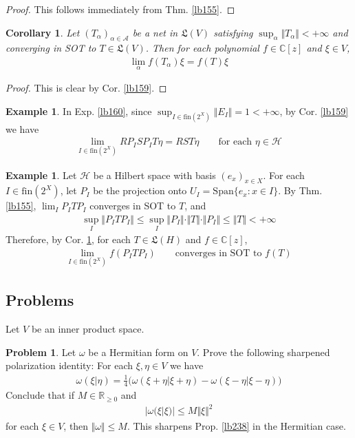 \documentclass[12pt,b5paper,notitlepage]{article}
\theoremstyle{definition}
\newtheorem{eg}[df]{Example}
\newtheorem{prob}{\color{red}Problem}[section]
\theoremstyle{plain}
\newtheorem{co}[df]{Corollary}
\newcommand{\fk}{\mathfrak}
\newcommand{\Span}{\mathrm{Span}}
\newcommand{\scr}{\mathscr}
\newcommand{\Cbb}{\mathbb C}
\newcommand{\Rbb}{\mathbb R}
\newcommand{\fin}{\mathrm{fin}}
\newcommand{\MH}{\mathcal H}
\numberwithin{equation}{section}
\begin{document}
\begin{proof}
This follows immediately from Thm. \ref{lb155}.
\end{proof}


\begin{co}\label{lb161}
Let $(T_\alpha)_{\alpha\in\scr A}$ be a net in $\fk L(V)$ satisfying $\sup_\alpha\Vert T_\alpha\Vert<+\infty$ and converging in SOT to $T\in\fk L(V)$. Then for each polynomial $f\in\Cbb[z]$ and $\xi\in V$,
\begin{align*}
\lim_\alpha f(T_\alpha)\xi=f(T)\xi
\end{align*}
\end{co}


\begin{proof}
This is clear by Cor. \ref{lb159}.
\end{proof}



\begin{eg}
In Exp. \ref{lb160}, since $\sup_{I\in\fin(2^X)}\Vert E_I\Vert=1<+\infty$, by Cor. \ref{lb159} we have
\begin{align*}
\lim_{I\in\fin(2^X)}RP_ISP_IT\eta=RST\eta\qquad\text{for each $\eta\in\MH$}
\end{align*}
\end{eg}




\begin{eg}\label{lb397}
Let $\MH$ be a Hilbert space with basis $(e_x)_{x\in X}$. For each $I\in\fin(2^X)$, let $P_I$ be the projection onto $U_I=\Span\{e_x:x\in I\}$. By Thm. \ref{lb155}, $\lim_I P_ITP_I$ converges in SOT to $T$, and 
\begin{align*}
\sup_I\Vert P_ITP_I\Vert\leq\sup_I \Vert P_I\Vert\cdot\Vert T\Vert\cdot\Vert P_I\Vert\leq \Vert T\Vert<+\infty
\end{align*}
Therefore, by Cor. \ref{lb161}, for each $T\in\fk L(H)$ and $f\in\Cbb[z]$, 
\begin{align*}
\lim_{I\in\fin(2^X)} f(P_ITP_I)\qquad\text{converges in SOT to }f(T)
\end{align*}
\end{eg}







\subsection{Problems}


Let $V$ be an inner product space. 
\begin{prob}
Let $\omega$ be a Hermitian form on $V$. Prove the following sharpened polarization identity: For each $\xi,\eta\in V$ we have
\begin{align}\label{eq145}
\omega(\xi|\eta)=\frac 14\big(\omega(\xi+\eta|\xi+\eta)-\omega(\xi-\eta|\xi-\eta)\big)
\end{align}
Conclude that if $M\in\Rbb_{\geq0}$ and
\begin{align*}
|\omega(\xi|\xi)|\leq M\Vert\xi\Vert^2
\end{align*}
for each $\xi\in V$, then $\Vert\omega\Vert\leq M$. This sharpens Prop. \ref{lb238} in the Hermitian case.
\end{prob}
\end{document}
